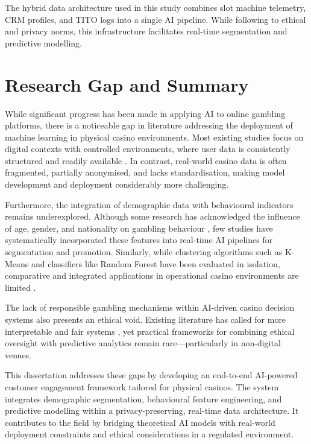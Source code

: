 \documentclass[12pt,a4paper]{report}
\begin{document}
The hybrid data architecture used in this study combines slot machine telemetry, CRM profiles, and TITO logs into a single AI pipeline.  While following to ethical and privacy norms, this infrastructure facilitates real-time segmentation and predictive modelling.

\section{Research Gap and Summary}

While significant progress has been made in applying AI to online gambling platforms, there is a noticeable gap in literature addressing the deployment of machine learning in physical casino environments. Most existing studies focus on digital contexts with controlled environments, where user data is consistently structured and readily available \citep{Auer2023, Omike2022a}. In contrast, real-world casino data is often fragmented, partially anonymised, and lacks standardisation, making model development and deployment considerably more challenging.

Furthermore, the integration of demographic data with behavioural indicators remains underexplored. Although some research has acknowledged the influence of age, gender, and nationality on gambling behaviour \citep{Hing2014, Desiata2024a}, few studies have systematically incorporated these features into real-time AI pipelines for segmentation and promotion. Similarly, while clustering algorithms such as K-Means and classifiers like Random Forest have been evaluated in isolation, comparative and integrated applications in operational casino environments are limited \citep{MacQueen1967, Breiman2001}.

The lack of responsible gambling mechanisms within AI-driven casino decision systems also presents an ethical void. Existing literature has called for more interpretable and fair systems \citep{Ladouceur2016, Abarbanel2022}, yet practical frameworks for combining ethical oversight with predictive analytics remain rare—particularly in non-digital venues.

This dissertation addresses these gaps by developing an end-to-end AI-powered customer engagement framework tailored for physical casinos. The system integrates demographic segmentation, behavioural feature engineering, and predictive modelling within a privacy-preserving, real-time data architecture. It contributes to the field by bridging theoretical AI models with real-world deployment constraints and ethical considerations in a regulated environment.
\end{document}
